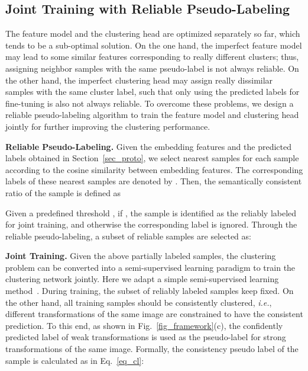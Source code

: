 \documentclass[journal]{IEEEtran}
\newcommand{\ie}{\emph{i.e.}\xspace}
\begin{document}
\subsection{Joint Training with Reliable Pseudo-Labeling}
\label{sec_semi}

The feature model and the clustering head are optimized separately so far, which tends to be a sub-optimal solution.
On the one hand, the imperfect feature model may lead to some similar features corresponding to really different clusters; thus, assigning neighbor samples with the same pseudo-label is not always reliable.
On the other hand, the imperfect clustering head may assign really dissimilar samples with the same cluster label, such that only using the predicted labels for fine-tuning is also not always reliable.
To overcome these problems, we design a reliable pseudo-labeling algorithm to train the feature model and clustering head  jointly for further improving the clustering performance.

\noindent\textbf{Reliable Pseudo-Labeling.}
Given the embedding features and the predicted labels  obtained in Section~\ref{sec_proto}, we select  nearest samples for each sample  according to the cosine similarity between embedding features. The corresponding labels of these nearest samples are denoted by . Then, the semantically consistent ratio  of the sample  is defined as

Given a predefined threshold , if , the sample  is identified as the reliably labeled for joint training, and otherwise the corresponding label is ignored.
Through the reliable pseudo-labeling, a subset of reliable samples  are selected as: 



\noindent\textbf{Joint Training.}
Given the above partially labeled samples, the clustering problem can be converted into a semi-supervised learning paradigm to train the clustering network jointly.
Here we adapt a simple semi-supervised learning method~\cite{fixmatch}.
During training, the subset of reliably labeled samples keep fixed.
On the other hand, all training samples should be consistently clustered, \ie, different transformations of the same image are constrained to have the consistent prediction.
To this end, as shown in Fig.~\ref{fig_framework}(c), the confidently predicted label of weak transformations is used as the pseudo-label for strong transformations of the same image.
Formally, the consistency pseudo label  of the sample  is calculated as in Eq.~\eqref{eq_cl}:
\end{document}
